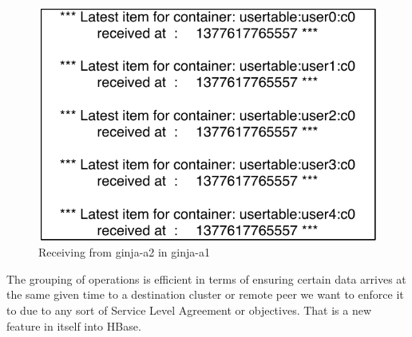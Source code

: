 \begin{figure}
\centering
\includegraphics[scale=.6]{figs/ginja1-grouping-receive.pdf}
\caption{Receiving from ginja-a2 in ginja-a1}
\label{fig-receiving-grouping}
\end{figure}


The grouping of operations is efficient in terms of ensuring certain data arrives at the same given time to a destination cluster or remote peer we want to enforce it to due to any sort of Service Level Agreement or objectives. That is a new feature in itself into HBase.
